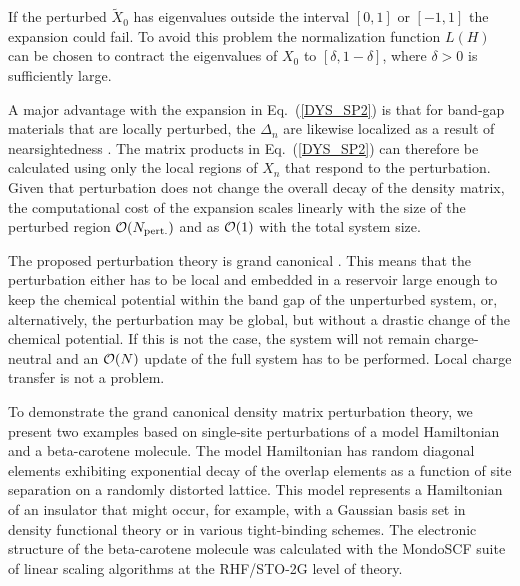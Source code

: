 If the perturbed ${\widetilde X}_0$ has eigenvalues outside
the interval $[0,1]$ or $[-1,1]$ the expansion could fail. To avoid this
problem the normalization function $L(H)$ can be chosen to contract the
eigenvalues of $X_0$ to $[\delta,1-\delta]$, where $\delta>0$ is sufficiently large.

A major advantage with the expansion in Eq.\ (\ref{DYS_SP2}) is that for band-gap 
materials that are locally perturbed, the $\Delta_n$ are likewise localized as a result 
of nearsightedness \cite{Kohn59,Kohn96}. The matrix products in Eq.\ (\ref{DYS_SP2}) 
can therefore be calculated using only the local regions of $X_n$ that respond to the perturbation.
Given that perturbation does not change the overall decay of the
density matrix, the computational cost of the expansion scales linearly with the
size of the perturbed region ${\cal O}(N_{\rm pert.})$ and as ${\cal O}(1)$ with
the total system size.

The proposed perturbation theory is grand canonical \cite{CPRT}. This means that 
the perturbation either has to be local and embedded in a reservoir large enough to
keep the chemical potential within the band gap of the unperturbed system, or,
alternatively, the perturbation may be global, but without a drastic
change of the chemical potential. If this is not the case, the system will 
not remain charge-neutral and an ${\cal O}(N)$ update of the full system has 
to be performed.  Local charge transfer is not a problem.

To demonstrate the grand canonical density matrix
perturbation theory, we present two examples based on single-site 
perturbations of a model Hamiltonian and a beta-carotene molecule.
The model Hamiltonian has random
diagonal elements exhibiting exponential decay of the overlap elements 
as a function of site separation on a randomly distorted 
lattice. This model represents a Hamiltonian of an insulator
that might occur, for example, with a Gaussian basis set in 
density functional theory or in various tight-binding schemes. 
The electronic structure of the beta-carotene molecule was calculated 
with the MondoSCF suite of linear scaling algorithms \cite{Mondo_SCF} 
at the RHF/STO-2G level of theory.

